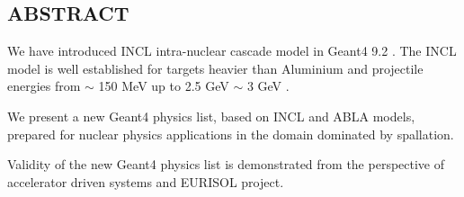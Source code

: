 \documentclass[20pt]{article}
\newenvironment{textbox}
{\begin{lrbox}{\dummybox}\begin{minipage}{0.9\columnwidth}}
{\end{minipage}\end{lrbox}\raisebox{-\depth}{\psshadowbox[framesep=1em,framearc=.1,shadow=true]{\usebox{\dummybox}}}\vspace{0.005\textheight}}
\begin{document}
\begin{center}
\vspace{-2cm}
\begin{multicols}{3}

\begin{textbox}

\section*{{\Huge {\sf ABSTRACT}}}


We have introduced INCL \cite{incl} intra-nuclear cascade model in {\sf Geant4 9.2} \cite{g4}.
The INCL model is well established for targets heavier than Aluminium
and projectile energies from $\sim$ 150 MeV up to 2.5 GeV $\sim$ 3 GeV \cite{pk08bProceedings}. 

\vspace{1cm}
{\color{udsect}
We present a new {\sf Geant4} physics list, based on INCL and ABLA models, 
prepared for nuclear physics applications
in the domain dominated by spallation.
}

\vspace{1cm}
Validity of the new {\sf Geant4} physics list 
is demonstrated from the perspective of accelerator driven systems
and EURISOL project.


\end{textbox}

\end{multicols}
\end{center}
\end{document}
